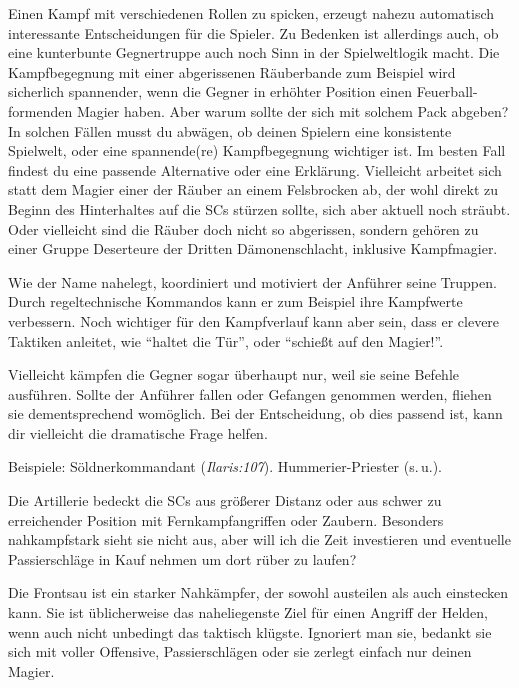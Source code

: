 Einen Kampf mit verschiedenen Rollen zu spicken, erzeugt nahezu automatisch interessante Entscheidungen für die Spieler.
Zu Bedenken ist allerdings auch, ob eine kunterbunte Gegnertruppe auch noch Sinn in der Spielweltlogik macht.
Die Kampfbegegnung mit einer abgerissenen Räuberbande zum Beispiel wird sicherlich spannender, wenn die Gegner in erhöhter Position einen Feuerball-formenden Magier haben.
Aber warum sollte der sich mit solchem Pack abgeben?
In solchen Fällen musst du abwägen, ob deinen Spielern eine konsistente Spielwelt, oder eine spannende(re) Kampfbegegnung wichtiger ist. 
Im besten Fall findest du eine passende Alternative oder eine Erklärung.
Vielleicht arbeitet sich statt dem Magier einer der Räuber an einem Felsbrocken ab, der wohl direkt zu Beginn des Hinterhaltes auf die SCs stürzen sollte, sich aber aktuell noch sträubt.
Oder vielleicht sind die Räuber doch nicht so abgerissen, sondern gehören zu einer Gruppe Deserteure der Dritten Dämonenschlacht, inklusive Kampfmagier.

Wie der Name nahelegt, koordiniert und motiviert der Anführer seine Truppen.
Durch regeltechnische Kommandos kann er zum Beispiel ihre Kampfwerte verbessern.
Noch wichtiger für den Kampfverlauf kann aber sein, dass er clevere Taktiken anleitet, wie \enquote{haltet die Tür}, oder \enquote{schießt auf den Magier!}.

Vielleicht kämpfen die Gegner sogar überhaupt nur, weil sie seine Befehle ausführen.
Sollte der Anführer fallen oder Gefangen genommen werden, fliehen sie dementsprechend womöglich.
Bei der Entscheidung, ob dies passend ist, kann dir vielleicht die dramatische Frage helfen.

Beispiele: Söldnerkommandant (\textit{Ilaris:107}). Hummerier-Priester (s.\,u.).

Die Artillerie bedeckt die SCs aus größerer Distanz oder aus schwer zu erreichender Position mit Fernkampfangriffen oder Zaubern.
Besonders nahkampfstark sieht sie nicht aus, aber will ich die Zeit investieren und eventuelle Passierschläge in Kauf nehmen um dort rüber zu laufen?



Die Frontsau ist ein starker Nahkämpfer, der sowohl austeilen als auch einstecken kann.
Sie ist üblicherweise das naheliegenste Ziel für einen Angriff der Helden, wenn auch nicht unbedingt das taktisch klügste.
Ignoriert man sie, bedankt sie sich mit voller Offensive, Passierschlägen oder sie zerlegt einfach nur deinen Magier.

